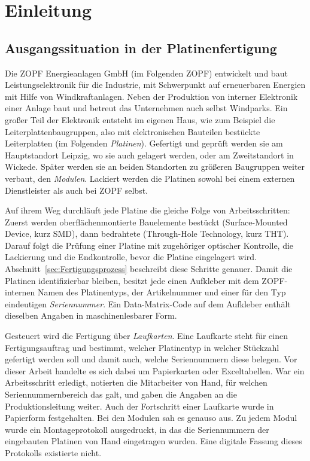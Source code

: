 \newcommand{\geplant}[1]{\textit{Geplanter Inhalt: #1}}

\chapter{Einleitung}
\label{sec:Einleitung}

\section{Ausgangssituation in der Platinenfertigung}
\label{sec:Ausgangssituation}
Die ZOPF Energieanlagen GmbH (im Folgenden ZOPF) entwickelt und baut
Leistungselektronik für die Industrie, mit Schwerpunkt auf erneuerbaren
Energien mit Hilfe von Windkraftanlagen. Neben der Produktion von interner Elektronik einer Anlage
baut und betreut das Unternehmen auch selbst Windparks.
Ein großer Teil der Elektronik entsteht im eigenen Haus, wie zum Beispiel die
Leiterplattenbaugruppen, also mit elektronischen Bauteilen bestückte
Leiterplatten (im Folgenden \emph{Platinen}). Gefertigt und
geprüft werden sie am Hauptstandort Leipzig, wo sie auch gelagert werden, oder am
Zweitstandort in Wickede. Später werden sie an beiden Standorten zu größeren Baugruppen
weiter verbaut, den \emph{Modulen}. Lackiert werden die Platinen sowohl bei einem externen Dienstleister
als auch bei ZOPF selbst.

Auf ihrem Weg durchläuft jede Platine die gleiche Folge von Arbeitsschritten:
Zuerst werden oberflächenmontierte Bauelemente bestückt (Surface-Mounted Device,
kurz SMD), dann bedrahtete (Through-Hole Technology, kurz THT). Darauf folgt die
Prüfung einer Platine mit zugehöriger optischer Kontrolle, die Lackierung und die Endkontrolle, bevor die
Platine eingelagert wird. Abschnitt~\ref{sec:Fertigungsprozess} beschreibt diese
Schritte genauer. Damit die Platinen identifizierbar bleiben, besitzt jede
einen Aufkleber mit dem ZOPF-internen Namen des Platinentyps, der
Artikelnummer und einer für den Typ eindeutigen \emph{Seriennummer}.
Ein Data-Matrix-Code auf dem Aufkleber enthält dieselben Angaben in maschinenlesbarer Form.

Gesteuert wird die Fertigung über \emph{Laufkarten}. Eine Laufkarte steht für
einen Fertigungsauftrag und bestimmt, welcher Platinentyp in welcher Stückzahl gefertigt werden soll und damit auch, welche Seriennummern diese belegen.
Vor dieser Arbeit handelte es sich dabei um Papierkarten oder Exceltabellen.
War ein Arbeitsschritt erledigt, notierten die Mitarbeiter von Hand, für welchen
Seriennummernbereich das galt, und gaben die Angaben an die Produktionsleitung
weiter. Auch der Fortschritt einer Laufkarte wurde in Papierform
festgehalten. Bei den Modulen sah es genauso aus. Zu jedem Modul wurde ein
Montageprotokoll ausgedruckt, in das die Seriennummern der eingebauten Platinen
von Hand eingetragen wurden. Eine digitale Fassung dieses Protokolls existierte nicht.

